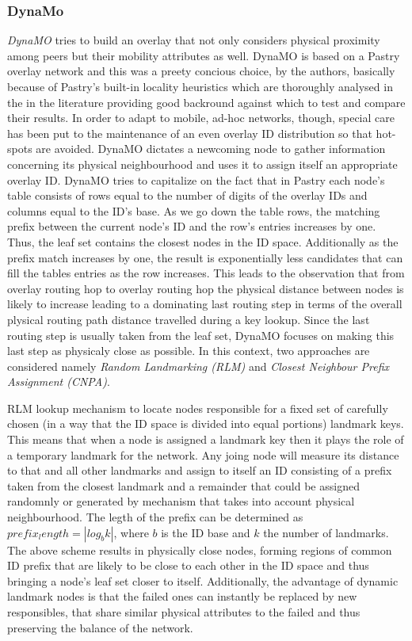 \subsubsection{DynaMo}
\emph{DynaMO} \cite{winter_dynamo_2004} tries to build an overlay that not only 
considers physical proximity among peers but their mobility attributes as well.
DynaMO is based on a Pastry overlay network and this was a preety concious
choice, by the authors, basically because of Pastry's built-in locality
heuristics which are thoroughly analysed in the in the literature
\cite{castro_proximityp2p_2002} providing good backround against which to test
and compare their results. In order to adapt to mobile, ad-hoc networks,
though, special care has been put to the maintenance of an even overlay ID
distribution so that hot-spots are avoided. DynaMO dictates a newcoming node to
gather information concerning its physical neighbourhood and uses it to assign
itself an appropriate overlay ID. DynaMO tries to capitalize on the fact that
in Pastry each node's table consists of rows equal to the number of digits of
the overlay IDs and columns equal to the ID's base. As we go down the table
rows, the matching prefix between the current node's ID and the row's entries
increases by one. Thus, the leaf set contains the closest nodes in the ID space.
Additionally as the prefix match increases by one, the result is exponentially
less candidates that can fill the tables entries as the row increases. This
leads to the observation \cite{antony_pastry_2001,castro_proximityp2p_2002} that
from overlay routing hop to overlay routing hop the physical distance between
nodes is likely to increase leading to a dominating last routing step in terms
of the overall plysical routing path distance travelled during a key lookup.
Since the last routing step is usually taken from the leaf set, DynaMO focuses
on making this last step as physicaly close as possible. In this context, two
approaches are considered namely \emph{Random Landmarking (RLM)} and
\emph{Closest Neighbour Prefix Assignment (CNPA)}.

RLM lookup mechanism to locate nodes responsible for a fixed set of carefully
chosen (in a way that the ID space is divided into equal portions) landmark
keys. This means that when a node is assigned a landmark key then it plays the
role of a temporary landmark for the network. Any joing node will measure its
distance to that and all other landmarks and assign to itself an ID consisting
of a prefix taken from the closest landmark and a remainder that could be
assigned randomnly or generated by mechanism that takes into account physical
neighbourhood. The legth of the prefix can be determined as
$prefix_length=|log_b k|$, where $b$ is the ID base and $k$ the number of
landmarks. The above scheme results in physically close nodes, forming regions
of common ID prefix that are likely to be close to each other in the ID space
and thus bringing a node's leaf set closer to itself. Additionally, the
advantage of dynamic landmark nodes is that the failed ones can instantly be
replaced by new responsibles, that share similar physical attributes to the
failed and thus preserving the balance of the network.

